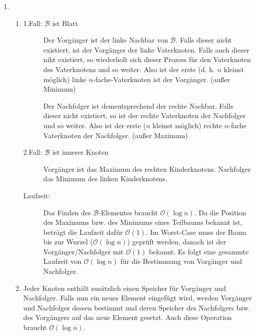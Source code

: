 \documentclass[a4paper,11pt]{article}             %
\begin{document}
\begin{enumerate}
\begin{enumerate}


\end{enumerate}

\item
\begin{enumerate}
\item
\begin{description}
\item[1.Fall: $\mathcal B$ ist Blatt] Der Vorgänger ist der linke Nachbar von $\mathcal B$. Falls dieser nicht existiert, ist der Vorgänger der linke Vaterknoten. Falls auch dieser niht existiert, so wiederholt sich dieser Prozess für den Vaterknoten des Vaterknotens und so weiter. Also ist der erste (d. h. $n$ kleinst möglich) linke $n$-fache-Vaterknoten ist der Vorgänger. (außer Minimum)

Der Nachfolger ist dementsprechend der rechte Nachbar. Falls dieser nicht existiert, so ist der rechte Vaterknoten der Nachfolger und so weiter. Also ist der erste ($n$ kleinst möglich) rechte $n$-fache Vaterknoten der Nachfolger. (außer Maximum)

\item[2.Fall: $\mathcal B$ ist innerer Knoten] Vorgänger ist das Maximum des rechten Kinderknotens. Nachfolger das Minimum des linken Kinderknotens.

\item[Laufzeit:] Das Finden des $\mathcal B$-Elementes braucht $\mathcal O(\log n)$. Da die Position des Maximums bzw. des Minimums eines Teilbaums bekannt ist, beträgt die Laufzeit dafür $\mathcal O(1)$. Im Worst-Case muss der Baum bis zur Wurzel ($\mathcal O(\log n)$) geprüft werden, danach ist der Vorgänger/Nachfolger mit $\mathcal O(1)$ bekannt. Es folgt eine gesammte Laufzeit von $\mathcal O(\log n)$ für die Bestimmung von Vorgänger und Nachfolger.
\end{description}

\item
Jeder Knoten enthält zusätzlich einen Speicher für Vorgänger und Nachfolger. Falls nun ein neues Element eingefügt wird, werden Vorgänger und Nachfolger dessen bestimmt und deren Speicher des Nachfolgers bzw. des Vorgängers auf das neue Element gesetzt. Auch diese Operation braucht $\mathcal O(\log n)$.


\end{enumerate}
\end{enumerate}
\end{document}
